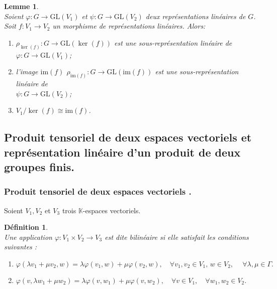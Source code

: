 \documentclass[a4paper, 14pt]{report}
\newtheorem{definition}{Définition}[section]
\newtheorem{lemma}{Lemme}
\begin{document}
\begin{onehalfspace}
{			
			
			\begin{lemma} \cite{renard2009groupes}\\
Soient \( \varphi : G \to \mathrm{GL}(V_1) \) et \( \psi : G \to \mathrm{GL}(V_2) \) deux représentations linéaires de \(G\).\\
Soit \( f : V_1 \rightarrow V_2 \) un morphisme de représentations linéaires. Alors:
				
				\begin{enumerate} [label=\roman*)]
					\item \( \rho_{\ker(f)} : G \rightarrow \mathrm{GL}(\ker(f)) \) est une sous-représentation linéaire de \( \varphi : G \to \mathrm{GL}(V_1) \);
					\item l'image \( \mathrm{im}(f) \)  \( \rho_{\mathrm{im}(f)} : G \rightarrow \mathrm{GL}(\mathrm{im}(f)) \) est une sous-représentation linéaire de \\
					\( \psi : G \to \mathrm{GL}(V_2) \);
					\item \(V_1 / \ker(f) \cong \mathrm{im}(f)  \).
				\end{enumerate}
			\end{lemma}

			\subsection{Produit tensoriel de deux espaces vectoriels et représentation linéaire d'un produit de deux groupes finis.}
			
			
			\subsubsection{Produit tensoriel de deux espaces vectoriels .}
			
			Soient \( V_1 , V_2 \) et \(V_3\) trois \(\mathbb{K}\)-espaces vectoriels.
			\begin{definition} \cite{greub2012linear}\\
Une application \(\varphi : V_1 \times V_2 \to V_3 \) est dite bilinéaire si elle satisfait les conditions suivantes :
				\begin{enumerate}[label=\roman*)]
					\item \(\varphi(\lambda v_1 + \mu v_2, w) = \lambda \varphi(v_1, w) + \mu \varphi(v_2, w), \quad \forall v_1, v_2 \in V_1, \, w \in V_2, \ \quad \forall \lambda, \mu \in \Gamma. \)
					
					\item \(\varphi(v, \lambda w_1 + \mu w_2) = \lambda \varphi(v, w_1) + \mu \varphi(v, w_2), \quad \forall v \in V_1, \quad \forall w_1, w_2 \in V_2.\)
				\end{enumerate}
			\end{definition}
			
}
\end{onehalfspace}
\end{document}
